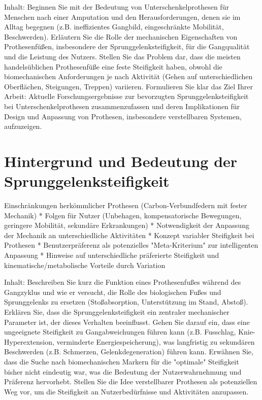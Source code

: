 \documentclass{SeminarV2}
\begin{document}
Inhalt: Beginnen Sie mit der Bedeutung von Unterschenkelprothesen für Menschen nach einer Amputation und den Herausforderungen, denen sie im Alltag begegnen (z.B. ineffizientes Gangbild, eingeschränkte Mobilität, Beschwerden). Erläutern Sie die Rolle der mechanischen Eigenschaften von Prothesenfüßen, insbesondere der Sprunggelenksteifigkeit, für die Gangqualität und die Leistung des Nutzers. Stellen Sie das Problem dar, dass die meisten handelsüblichen Prothesenfüße eine feste Steifigkeit haben, obwohl die biomechanischen Anforderungen je nach Aktivität (Gehen auf unterschiedlichen Oberflächen, Steigungen, Treppen) variieren. Formulieren Sie klar das Ziel Ihrer Arbeit: Aktuelle Forschungsergebnisse zur bevorzugten Sprunggelenksteifigkeit bei Unterschenkelprothesen zusammenzufassen und deren Implikationen für Design und Anpassung von Prothesen, insbesondere verstellbaren Systemen, aufzuzeigen.

\section{Hintergrund und Bedeutung der Sprunggelenksteifigkeit}  
Einschränkungen herkömmlicher Prothesen (Carbon-Verbundfedern mit fester Mechanik) *   Folgen für Nutzer (Unbehagen, kompensatorische Bewegungen, geringere Mobilität, sekundäre Erkrankungen) *   Notwendigkeit der Anpassung der Mechanik an unterschiedliche Aktivitäten *   Konzept variabler Steifigkeit bei Prothesen *   Benutzerpräferenz als potenzielles "Meta-Kriterium" zur intelligenten Anpassung *   Hinweise auf unterschiedliche präferierte Steifigkeit und kinematische/metabolische Vorteile durch Variation

Inhalt: Beschreiben Sie kurz die Funktion eines Prothesenfußes während des Gangzyklus und wie er versucht, die Rolle des biologischen Fußes und Sprunggelenks zu ersetzen (Stoßabsorption, Unterstützung im Stand, Abstoß). Erklären Sie, dass die Sprunggelenksteifigkeit ein zentraler mechanischer Parameter ist, der dieses Verhalten beeinflusst. Gehen Sie darauf ein, dass eine ungeeignete Steifigkeit zu Gangabweichungen führen kann (z.B. Fusschlag, Knie-Hyperextension, verminderte Energiespeicherung), was langfristig zu sekundären Beschwerden (z.B. Schmerzen, Gelenkdegeneration) führen kann. Erwähnen Sie, dass die Suche nach biomechanischen Markern für die "optimale" Steifigkeit bisher nicht eindeutig war, was die Bedeutung der Nutzerwahrnehmung und Präferenz hervorhebt. Stellen Sie die Idee verstellbarer Prothesen als potenziellen Weg vor, um die Steifigkeit an Nutzerbedürfnisse und Aktivitäten anzupassen.
\end{document}
